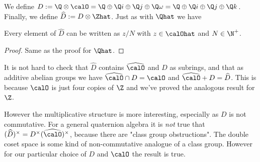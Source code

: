 We define $D:=\Q\otimes\calO=\Q\oplus\Q i\oplus\Q j\oplus\Q\omega=\Q\oplus\Q i\oplus\Q j\oplus\Q k$.
Finally, we define $\widehat{D}:=D\otimes\Zhat$. Just as with $\Qhat$ we have

\begin{lemma}
    \label{Hurwitz.canonicalForm}
    \leanok
    Every element of $\widehat{D}$ can be written as $z/N$ with $z\in\calOhat$ and $N\in\N^+$.
\end{lemma}
\begin{proof}
    Same as the proof for $\Qhat$.
\end{proof}

It is not hard to check that $\widehat{D}$ contains $\widehat{\calO}$
and $D$ as subrings, and that as additive abelian groups we have
$\widehat{\calO}\cap D=\calO$ and $\widehat{\calO}+D=\widehat{D}$.
This is because $\calO$ is just four copies of $\Z$ and we've proved
the analogous result for $\Z$.

However the multiplicative structure is more interesting, especially
as $D$ is not commutative. For a general quaternion algebra it is \emph{not}
true that $(\widehat{D})^\times=D^\times(\widehat{\calO})^\times$, because
there are "class group obstructions". The double coset space is some
kind of non-commutative analogue of a class group. However for our
particular choice of $D$ and $\calO$ the result is true.

